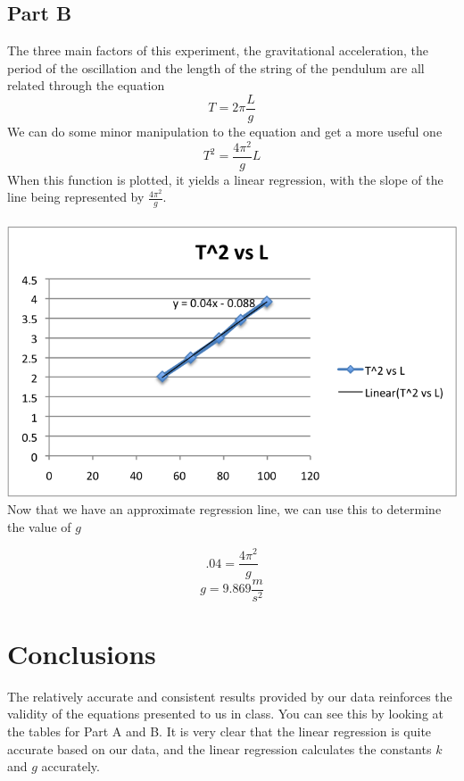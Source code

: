 \documentclass[twocolumn]{article}
\begin{document}
\subsection{Part B}\label{sub:part_b}
The three main factors of this experiment, the gravitational acceleration, the period of the oscillation and the length of the string of the pendulum are all related through the equation
\begin{equation}
	T = 2 \pi \frac{L}{g}
\end{equation}
We can do some minor manipulation to the equation and get a more useful one
\begin{equation}
	T^2 = \frac{4 \pi^2}{g} L
\end{equation}
When this function is plotted, it yields a linear regression, with the slope of the line being represented by $\frac{4 \pi^2}{g}$.
\\
\\
\includegraphics[scale=.65]{t2vsl.png}
\\
Now that we have an approximate regression line, we can use this to determine the value of $g$

\[
	.04 = \frac{4 \pi^2}{g}
\]
\[
	g = 9.869 \frac{m}{s^2}
\]


\section{Conclusions}\label{sec:conclusions}
The relatively accurate and consistent results provided by our data reinforces the validity of the equations presented to us in class. You can see this by looking at the tables for Part A and B. It is very clear that the linear regression is quite accurate based on our data, and the linear regression calculates the constants $k$ and $g$ accurately.
\end{document}
